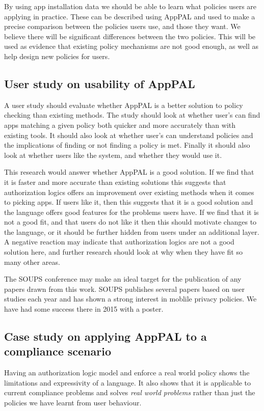 \documentclass{scrartcl}
\begin{document}
By using app installation data we should be able to learn what policies users are applying in practice.
These can be described using AppPAL and used to make a precise comparison between the policies users use, and those they want.
We believe there will be significant differences between the two policies.
This will be used as evidence that existing policy mechanisms are not good enough, as well as help design new policies for users.

\subsection{User study on usability of AppPAL}

A user study should evaluate whether AppPAL is a better solution to policy checking than existing methods.
The study should look at whether user's can find apps matching a given policy both quicker and more accurately than with existing tools.
It should also look at whether user's can understand policies and the implications of finding or not finding a policy is met.
Finally it should also look at whether users like the system, and whether they would use it.

This research would answer whether AppPAL is a good solution.
If we find that it is faster and more accurate than existing solutions this suggests that authorization logics offers an improvement over existing methods when it comes to picking apps.
If users like it, then this suggests that it is a good solution and the language offers good features for the problems users have.
If we find that it is not a good fit, and that users do not like it then this should motivate changes to the language, or it should be further hidden from users under an additional layer.
A negative reaction may indicate that authorization logics are not a good solution here, and further research should look at why when they have fit so many other areas.

The SOUPS conference may make an ideal target for the publication of any papers drawn from this work.
SOUPS publishes several papers based on user studies each year and has shown a strong interest in moblile privacy policies.
We have had some success there in 2015 with a poster.

\subsection{Case study on applying AppPAL to a compliance scenario}

Having an authorization logic model and enforce a real world policy shows the limitations and expressivity of a language.
It also shows that it is applicable to current compliance problems and solves \emph{real world problems} rather than just the policies we have learnt from user behaviour.
\end{document}
